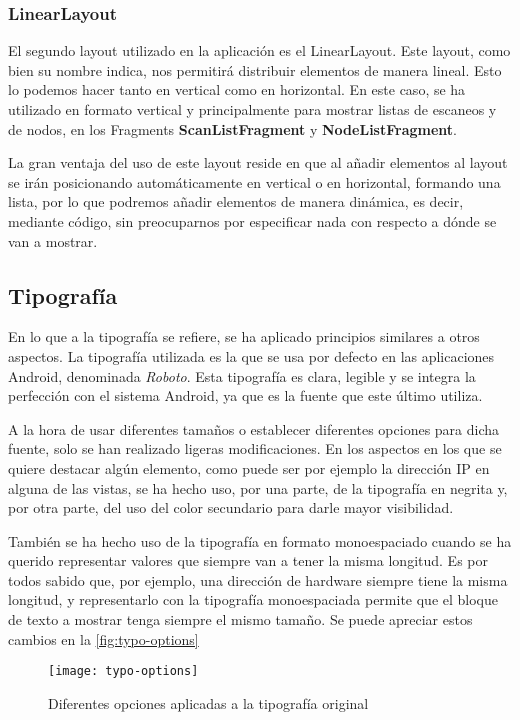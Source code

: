 \subsubsection{LinearLayout}

El segundo layout utilizado en la aplicación es el LinearLayout. Este layout, como bien su nombre indica, nos permitirá distribuir elementos de manera lineal. Esto lo podemos hacer tanto en vertical como en horizontal. En este caso, se ha utilizado en formato vertical y principalmente para mostrar listas de escaneos y de nodos, en los Fragments \textbf{ScanListFragment} y \textbf{NodeListFragment}. 

La gran ventaja del uso de este layout reside en que al añadir elementos al layout se irán posicionando automáticamente en vertical o en horizontal, formando una lista, por lo que podremos añadir elementos de manera dinámica, es decir, mediante código, sin preocuparnos por especificar nada con respecto a dónde se van a mostrar.

\subsection{Tipografía}

En lo que a la tipografía se refiere, se ha aplicado principios similares a otros aspectos. La tipografía utilizada es la que se usa por defecto en las aplicaciones Android, denominada \textit{Roboto}. Esta tipografía es clara, legible y se integra la perfección con el sistema Android, ya que es la fuente que este último utiliza.

A la hora de usar diferentes tamaños o establecer diferentes opciones para dicha fuente, solo se han realizado ligeras modificaciones. En los aspectos en los que se quiere destacar algún elemento, como puede ser por ejemplo la dirección IP en alguna de las vistas, se ha hecho uso, por una parte, de la tipografía en negrita y, por otra parte, del uso del color secundario para darle mayor visibilidad.

También se ha hecho uso de la tipografía en formato monoespaciado cuando se ha querido representar valores que siempre van a tener la misma longitud. Es por todos sabido que, por ejemplo, una dirección de hardware siempre tiene la misma longitud, y representarlo con la tipografía monoespaciada permite que el bloque de texto a mostrar tenga siempre el mismo tamaño. Se puede apreciar estos cambios en la \autoref{fig:typo-options}

\begin{figure}[H]
	\centering
	\texttt{[image: typo-options]}
	\caption{Diferentes opciones aplicadas a la tipografía original}
	\label{fig:typo-options}
\end{figure}

